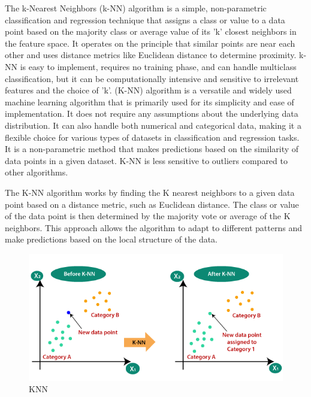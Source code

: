 \documentclass[12pt,a4paper]{report}
\begin{document}
The k-Nearest Neighbors (k-NN) algorithm is a simple, non-parametric classification and regression technique that assigns a class or value to a data point based on the majority class or average value of its 'k' closest neighbors in the feature space. It operates on the principle that similar points are near each other and uses distance metrics like Euclidean distance to determine proximity. k-NN is easy to implement, requires no training phase, and can handle multiclass classification, but it can be computationally intensive and sensitive to irrelevant features and the choice of 'k'.
(K-NN) algorithm is a versatile and widely used machine learning algorithm that is primarily used for its simplicity and ease of implementation. It does not require any assumptions about the underlying data distribution. It can also handle both numerical and categorical data, making it a flexible choice for various types of datasets in classification and regression tasks. It is a non-parametric method that makes predictions based on the similarity of data points in a given dataset. K-NN is less sensitive to outliers compared to other algorithms.

The K-NN algorithm works by finding the K nearest neighbors to a given data point based on a distance metric, such as Euclidean distance. The class or value of the data point is then determined by the majority vote or average of the K neighbors. This approach allows the algorithm to adapt to different patterns and make predictions based on the local structure of the data.\cite{javatpoint_knn}

\begin{figure}[htbp]
    \centering
    \includegraphics[width=\textwidth]{KNN.png}
    \caption{KNN}
    \label{fig:KNN}
\end{figure}
\end{document}
